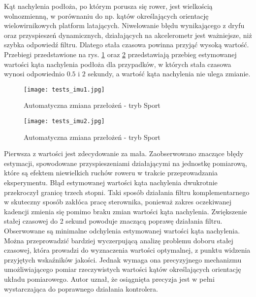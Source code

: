 Kąt nachylenia podłoża, po którym porusza się rower, jest wielkością wolnozmienną, w porównaniu do np. kątów określających orientację wielowirnikowych platform latających. Niwelowanie błędu wynikającego z dryfu oraz przyspieszeń dynamicznych, działających na akcelerometr jest ważniejsze, niż szybka odpowiedź filtru. Dlatego stała czasowa powinna przyjąć wysoką wartość. Przebiegi przedstawione na rys. \ref{fig:tests_imu1} oraz \ref{fig:tests_imu2} przedstawiają przebieg estymowanej wartości kąta nachylenia podłoża dla przypadków, w których stała czasowa wynosi odpowiednio $0.5$ i $2$ sekundy, a wartość kąta nachylenia nie ulega zmianie.
\begin{figure}[h]
    \centering
    \texttt{[image: tests\_imu1.jpg]}
    \caption{Automatyczna zmiana przełożeń - tryb Sport}
    \label{fig:tests_imu1}
\end{figure}

\begin{figure}[h]
    \centering
    \texttt{[image: tests\_imu2.jpg]}
    \caption{Automatyczna zmiana przełożeń - tryb Sport}
    \label{fig:tests_imu2}
\end{figure}
Pierwsza z wartości jest zdecydowanie za mała. Zaobserwowano znaczące błędy estymacji, spowodowane  przyspieszeniami działającymi na jednostkę pomiarową, które są efektem niewielkich ruchów roweru w trakcie przeprowadzania eksperymentu. Błąd estymowanej wartości kąta nachylenia dwukrotnie przekroczył granicę trzech stopni. Taki sposób działania filtru komplementarnego w skuteczny sposób zakłóca pracę sterownika, ponieważ zakres oczekiwanej kadencji zmienia się pomimo braku zmian wartości kąta nachylenia. Zwiększenie stałej czasowej do 2 sekund powoduje znaczącą poprawę działania filtru. Obserwowane są minimalne odchylenia estymowanej wartości kąta nachylenia. Można przeprowadzić bardziej wyczerpującą analizę problemu doboru stałej czasowej, która prowadzi do wyznaczenia wartości optymalnej, z punktu widzenia przyjętych wskaźników jakości. Jednak wymaga ona precyzyjnego mechanizmu umożliwiającego pomiar rzeczywistych wartości kątów określających orientację układu pomiarowego. Autor uznał, że osiągnięta precyzja jest w pełni wystarczająca do poprawnego działania kontrolera.



